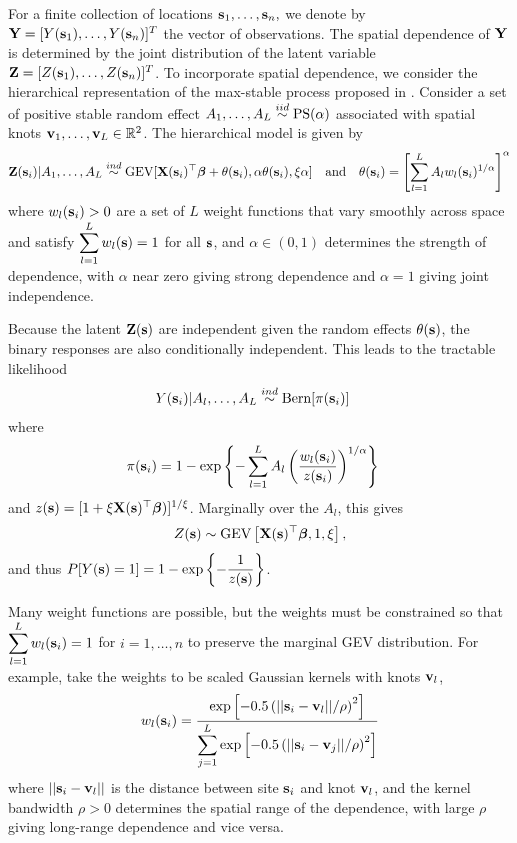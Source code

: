 \documentclass[11pt]{article}
\begin{document}
For a finite collection of locations $\mbox{\bf s}_1, \ldots, \mbox{\bf s}_n,$ we denote by $\mbox{\bf Y} = [Y(\mbox{\bf s}_1), \ldots, Y(\mbox{\bf s}_n)]^T$ the vector of observations.
The spatial dependence of $\mbox{\bf Y}$ is determined by the joint distribution of the latent variable $\mbox{\bf Z} = [Z(\mbox{\bf s}_1),\ldots, Z(\mbox{\bf s}_n)]^T$.
To incorporate spatial dependence, we consider the hierarchical representation of the max-stable process proposed in \citet{Reich2012}.
Consider a set of positive stable random effect $A_1, \ldots, A_L \stackrel{iid}{\sim} \text{PS}(\alpha)$ associated with spatial knots $\mbox{\bf v}_1, \ldots, \mbox{\bf v}_L \in \mathbb{R}^2$.
The hierarchical model is given by
\begin{align} \label{rbeq:hiermodel}
  \mbox{\bf Z}(\mbox{\bf s}_i) | A_1, \ldots, A_L \stackrel{ind}{\sim} \text{GEV}[\mbox{\bf X}(\mbox{\bf s}_i)^\top \mbox{\boldmath $\beta$} + \theta(\mbox{\bf s}_i), \alpha \theta(\mbox{\bf s}_i), \xi \alpha] \quad \text{and} \quad \theta(\mbox{\bf s}_i) = \left[\sum_{l = 1}^L A_l w_l (\mbox{\bf s}_i)^{1 / \alpha} \right]^\alpha
\end{align}
where $w_{l}(\mbox{\bf s}_i) > 0$ are a set of $L$ weight functions that vary smoothly across space and satisfy $\displaystyle \sum_{l = 1}^L w_l(\mbox{\bf s}) = 1$ for all $\mbox{\bf s}$, and $\alpha\in(0,1)$ determines the strength of dependence, with $\alpha$ near zero giving strong dependence and $\alpha=1$ giving joint independence.

Because the latent $\mbox{\bf Z}(\mbox{\bf s})$ are independent given the random effects $\theta(\mbox{\bf s})$, the binary responses are also conditionally independent.
This leads to the tractable likelihood
\begin{align} \label{rbeq:condlike}
  Y(\mbox{\bf s}_i) | A_l, \ldots, A_L &\stackrel{ind}{\sim} \text{Bern}[\pi(\mbox{\bf s}_i)]
\end{align}
where
\begin{align} \label{rbeq:pyeq1cond}
  \pi(\mbox{\bf s}_i) &= 1 - \exp \left\{ -\displaystyle \sum_{ l = 1 }^{L} A_l \left( \frac{ w_{l}(\mbox{\bf s}_i) }{ z(\mbox{\bf s}_i) } \right)^{ 1/\alpha} \right\}
\end{align}
and $z(\mbox{\bf s}) = [1 + \xi \mbox{\bf X}(\mbox{\bf s})^\top \mbox{\boldmath $\beta$})]^{1 / \xi}$.
Marginally over the $A_l$, this gives
\begin{align}
  Z(\mbox{\bf s}) \sim \text{GEV}\left[\mbox{\bf X}(\mbox{\bf s})^\top \mbox{\boldmath $\beta$}, 1, \xi\right],
\end{align}
and thus $P[Y(\mbox{\bf s}) = 1] = 1 - \exp\left\{-\displaystyle \frac{1}{z(\mbox{\bf s})}\right\}$.

Many weight functions are possible, but the weights must be constrained so that $\displaystyle \sum_{l=1}^L w_{l}(\mbox{\bf s}_i)=1$ for $i=1,\ldots,n$ to preserve the marginal GEV distribution.
For example, \cite{Reich2012} take the weights to be scaled Gaussian kernels with knots $\mbox{\bf v}_l$,
\begin{align}\label{rbeq:w}
   w_{l}(\mbox{\bf s}_i) = \frac{\exp\left[-0.5\left(||\mbox{\bf s}_i-\mbox{\bf v}_l||/\rho\right)^2\right]}
                 {\displaystyle \sum_{j=1}^L\exp\left[-0.5\left(||\mbox{\bf s}_i-\mbox{\bf v}_j||/\rho\right)^2\right]}
\end{align}
where $||\mbox{\bf s}_i - \mbox{\bf v}_l||$ is the distance between site $\mbox{\bf s}_i$ and knot $\mbox{\bf v}_l$, and the kernel bandwidth $\rho>0$ determines the spatial range of the dependence, with large $\rho$ giving long-range dependence and vice versa.
\end{document}
